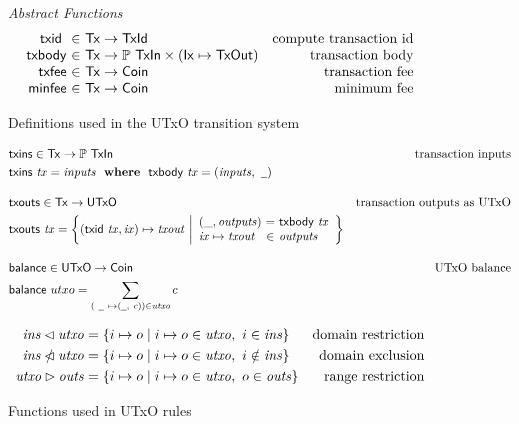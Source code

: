 \documentclass[11pt,a4paper]{article}
\newcommand{\Tx}{\type{Tx}}
\newcommand{\Ix}{\type{Ix}}
\newcommand{\TxId}{\type{TxId}}
\newcommand{\UTxO}{\type{UTxO}}
\newcommand{\Coin}{\type{Coin}}
\newcommand{\TxIn}{\type{TxIn}}
\newcommand{\TxOut}{\type{TxOut}}
\newcommand{\txins}[1]{\fun{txins}~ \var{#1}}
\newcommand{\txid}[1]{\fun{txid}~ \var{#1}}
\newcommand{\txbody}[1]{\fun{txbody}~ \var{#1}}
\newcommand{\wcard}[0]{\underline{\phantom{a}}}
\begin{document}
\begin{figure*}
  \emph{Abstract Functions}
  \begin{equation*}
    \begin{array}{r@{~\in~}lr}
      \txid{} & \Tx \to \TxId & \text{compute transaction id}\\
      \fun{txbody} & \Tx \to \powerset{\TxIn} \times (\Ix \mapsto \TxOut)
                                  & \text{transaction body}\\
      \fun{txfee} & \Tx \to \Coin & \text{transaction fee}\\
      \fun{minfee} & \Tx \to \Coin & \text{minimum fee}
    \end{array}
  \end{equation*}
  \caption{Definitions used in the UTxO transition system}
  \label{fig:defs:utxo}
\end{figure*}

\begin{figure}
  \begin{align*}
    & \fun{txins} \in \Tx \to \powerset{\TxIn}
    & \text{transaction inputs} \\
    & \txins{tx} = \var{inputs} \where \txbody{tx} = (\var{inputs}, ~\wcard)
    \nextdef
    & \fun{txouts} \in \Tx \to \UTxO
    & \text{transaction outputs as UTxO} \\
    & \fun{txouts} ~ \var{tx} =
      \left\{ (\fun{txid} ~ \var{tx}, \var{ix}) \mapsto \var{txout} ~
      \middle| \begin{array}{l@{~}c@{~}l}
                 (\_, \var{outputs}) & = & \txbody{tx} \\
                 \var{ix} \mapsto \var{txout} & \in & \var{outputs}
               \end{array}
      \right\}
    \nextdef
    & \fun{balance} \in \UTxO \to \Coin
    & \text{UTxO balance} \\
    & \fun{balance} ~ utxo = \sum_{(~\wcard ~ \mapsto (\wcard, ~c)) \in \var{utxo}} c
  \end{align*}

  \begin{align*}
    \mathit{ins} \lhd \mathit{utxo}
    & = \{ i \mapsto o \mid i \mapsto o \in \mathit{utxo}, ~ i \in \mathit{ins} \}
    & \text{domain restriction}
    \\
    \mathit{ins} \mathbin{\slashed{\lhd}} \mathit{utxo}
    & = \{ i \mapsto o \mid i \mapsto o \in \mathit{utxo}, ~ i \notin \mathit{ins} \}
    & \text{domain exclusion}
    \\
    \mathit{utxo} \rhd \mathit{outs}
    & = \{ i \mapsto o \mid i \mapsto o \in \mathit{utxo}, ~ o \in \mathit{outs} \}
    & \text{range restriction}
  \end{align*}
  \caption{Functions used in UTxO rules}
  \label{fig:derived-defs:utxo}
\end{figure}
\end{document}
